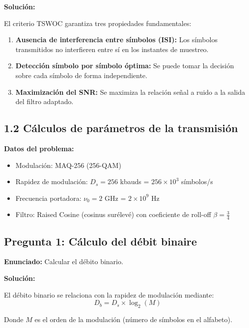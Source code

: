 \documentclass[11pt,a4paper]{article}
\begin{document}
\vspace{0.3cm}
\textbf{Soluci\'on:}

El criterio TSWOC garantiza tres propiedades fundamentales:

\begin{enumerate}
    \item \textbf{Ausencia de interferencia entre s\'imbolos (ISI):} Los s\'imbolos transmitidos no interfieren entre s\'i en los instantes de muestreo.
    
    \item \textbf{Detecci\'on s\'imbolo por s\'imbolo \'optima:} Se puede tomar la decisi\'on sobre cada s\'imbolo de forma independiente.
    
    \item \textbf{Maximizaci\'on del SNR:} Se maximiza la relaci\'on se\~nal a ruido a la salida del filtro adaptado.
\end{enumerate}



\subsection*{1.2 C\'alculos de par\'ametros de la transmisi\'on}

\textbf{Datos del problema:}
\begin{itemize}
    \item Modulaci\'on: MAQ-256 (256-QAM)
    \item Rapidez de modulaci\'on: $D_s = 256$ kbauds = $256 \times 10^3$ s\'imbolos/s
    \item Frecuencia portadora: $\nu_0 = 2$ GHz = $2 \times 10^9$ Hz
    \item Filtro: Raised Cosine (cosinus sur\'elev\'e) con coeficiente de roll-off $\beta = \frac{3}{4}$
\end{itemize}

\subsection*{Pregunta 1: C\'alculo del d\'ebit binaire}

\textbf{Enunciado:} Calcular el d\'ebito binario.

\vspace{0.3cm}
\textbf{Soluci\'on:}

El d\'ebito binario se relaciona con la rapidez de modulaci\'on mediante:
\[
D_b = D_s \times \log_2(M)
\]

Donde $M$ es el orden de la modulaci\'on (n\'umero de s\'imbolos en el alfabeto).
\end{document}
